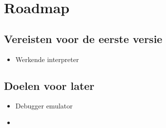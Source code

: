 \documentclass[main.tex]{subfiles}
\begin{document}
\section{Roadmap}
\subsection{Vereisten voor de eerste versie}
\begin{itemize}
    \item Werkende interpreter
\end{itemize}

\subsection{Doelen voor later}
\begin{itemize}
    \item Debugger emulator
    \item 
\end{itemize}
\end{document}
